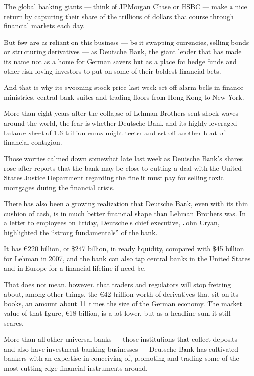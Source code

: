The global banking giants --- think of JPMorgan Chase or HSBC --- make a
nice return by capturing their share of the trillions of dollars that
course through financial markets each day.

But few are as reliant on this business --- be it swapping currencies,
selling bonds or structuring derivatives --- as Deutsche Bank, the giant
lender that has made its name not as a home for German savers but as a
place for hedge funds and other risk-loving investors to put on some of
their boldest financial bets.

And that is why its swooning stock price last week set off alarm bells
in finance ministries, central bank suites and trading floors from Hong
Kong to New York.

More than eight years after the collapse of Lehman Brothers sent shock
waves around the world, the fear is whether Deutsche Bank and its highly
leveraged balance sheet of 1.6 trillion euros might teeter and set off
another bout of financial contagion.

\href{http://www.nytimes.com/2016/10/01/business/dealbook/deutsche-bank-stock-bailout.html?ref=dealbook}{Those
worries} calmed down somewhat late last week as Deutsche Bank's shares
rose after reports that the bank may be close to cutting a deal with the
United States Justice Department regarding the fine it must pay for
selling toxic mortgages during the financial crisis.

There has also been a growing realization that Deutsche Bank, even with
its thin cushion of cash, is in much better financial shape than Lehman
Brothers was. In a letter to employees on Friday, Deutsche's chief
executive, John Cryan, highlighted the ``strong fundamentals'' of the
bank.

It has €220 billion, or \$247 billion, in ready liquidity, compared with
\$45 billion for Lehman in 2007, and the bank can also tap central banks
in the United States and in Europe for a financial lifeline if need be.

That does not mean, however, that traders and regulators will stop
fretting about, among other things, the €42 trillion worth of
derivatives that sit on its books, an amount about 11 times the size of
the German economy. The market value of that figure, €18 billion, is a
lot lower, but as a headline sum it still scares.

More than all other universal banks --- those institutions that collect
deposits and also have investment banking businesses --- Deutsche Bank
has cultivated bankers with an expertise in conceiving of, promoting and
trading some of the most cutting-edge financial instruments around.


